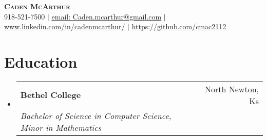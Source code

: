 \documentclass[letterpaper,11pt]{article}
\makeatletter
\newcommand{\resumeSubheading}[4]{
  \vspace{-2pt}\item
    \begin{tabular*}{0.97\textwidth}[t]{l@{\extracolsep{\fill}}r}
      \textbf{#1} & #2 \\
      \textit{\small#3} & \textit{\small #4} \\
    \end{tabular*}\vspace{-7pt}
}
\newcommand{\resumeSubHeadingListStart}{\begin{itemize}[leftmargin=0.15in, label={}]}
\newcommand{\resumeSubHeadingListEnd}{\end{itemize}}
\makeatother
\begin{document}

\begin{center}
    \textbf{\Huge \scshape Caden McArthur   } \\ \vspace{1pt}
    \small 918-521-7500 $|$ \href{mailto:x@x.com}{\underline{email: Caden.mcarthur@gmail.com}} $|$ 
    \underline{www.linkedin.com/in/cadenmcarthur/} $|$
    \underline{https://github.com/cmac2112}
\end{center}


\section{Education}
  \resumeSubHeadingListStart
    \resumeSubheading
      {Bethel College}{North Newton, Ks}
      {Bachelor of Science in Computer Science, Minor in Mathematics}{}
      
  \resumeSubHeadingListEnd
\end{document}
